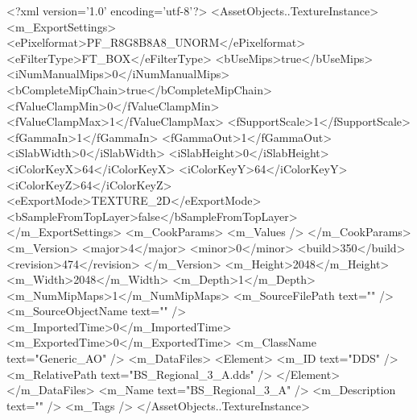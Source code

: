 <?xml version='1.0' encoding='utf-8'?>
<AssetObjects..TextureInstance>
  <m_ExportSettings>
    <ePixelformat>PF_R8G8B8A8_UNORM</ePixelformat>
    <eFilterType>FT_BOX</eFilterType>
    <bUseMips>true</bUseMips>
    <iNumManualMips>0</iNumManualMips>
    <bCompleteMipChain>true</bCompleteMipChain>
    <fValueClampMin>0</fValueClampMin>
    <fValueClampMax>1</fValueClampMax>
    <fSupportScale>1</fSupportScale>
    <fGammaIn>1</fGammaIn>
    <fGammaOut>1</fGammaOut>
    <iSlabWidth>0</iSlabWidth>
    <iSlabHeight>0</iSlabHeight>
    <iColorKeyX>64</iColorKeyX>
    <iColorKeyY>64</iColorKeyY>
    <iColorKeyZ>64</iColorKeyZ>
    <eExportMode>TEXTURE_2D</eExportMode>
    <bSampleFromTopLayer>false</bSampleFromTopLayer>
  </m_ExportSettings>
  <m_CookParams>
    <m_Values />
  </m_CookParams>
  <m_Version>
    <major>4</major>
    <minor>0</minor>
    <build>350</build>
    <revision>474</revision>
  </m_Version>
  <m_Height>2048</m_Height>
  <m_Width>2048</m_Width>
  <m_Depth>1</m_Depth>
  <m_NumMipMaps>1</m_NumMipMaps>
  <m_SourceFilePath text="" />
  <m_SourceObjectName text="" />
  <m_ImportedTime>0</m_ImportedTime>
  <m_ExportedTime>0</m_ExportedTime>
  <m_ClassName text="Generic_AO" />
  <m_DataFiles>
    <Element>
      <m_ID text="DDS" />
      <m_RelativePath text="BS_Regional_3_A.dds" />
    </Element>
  </m_DataFiles>
  <m_Name text="BS_Regional_3_A" />
  <m_Description text="" />
  <m_Tags />
</AssetObjects..TextureInstance>